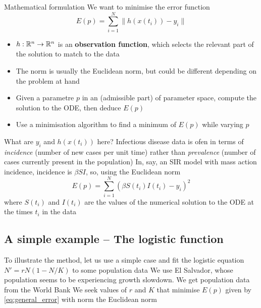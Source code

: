 \documentclass[aspectratio=43]{beamer}
\begin{document}
\begin{frame}{Mathematical formulation}
We want to minimise the error function
\begin{equation}\label{eq:general_error}
    E(p) = \sum_{i=1}^N \|h(x(t_i))-y_i\|
\end{equation}
\begin{itemize}
    \item $h:\mathbb{R}^n\to\mathbb{R}^n$ is an \textbf{observation function}, which selects the relevant part of the solution to match to the data
    \item The norm is usually the Euclidean norm, but could be different depending on the problem at hand
    \item Given a parametre $p$ in an (admissible part) of parameter space, compute the solution to the ODE, then deduce $E(p)$
    \item Use a minimisation algorithm to find a minimum of $E(p)$ while varying $p$  
\end{itemize}
\end{frame}



\begin{frame}{What are $y_i$ and $h(x(t_i))$ here?}
    Infectious disease data is ofen in terms of \emph{incidence} (number of new cases per unit time) rather than \emph{prevalence} (number of cases currently present in the population)
    \vfill
    In, say, an SIR model with mass action incidence, incidence is $\beta SI$, so, using the Euclidean norm
    \begin{equation}
        E(p)=\sum_{i=1}^N(\beta S(t_i)I(t_i)-y_i)^2
    \end{equation}
    where $S(t_i)$ and $I(t_i)$ are the values of the numerical solution to the ODE at the times $t_i$ in the data 
\end{frame}


\subsection{A simple example -- The logistic function}

\begin{frame}{}
    To illustrate the method, let us use  a simple case and fit the logistic equation $N'=rN(1-N/K)$ to some population data
    \vfill 
    We use El Salvador, whose population seems to be experiencing growth slowdown. We get population data from the World Bank
    \vfill
    We seek values of $r$ and $K$ that minimise $E(p)$ given by \eqref{eq:general_error} with norm the Euclidean norm
\end{frame}
\end{document}
